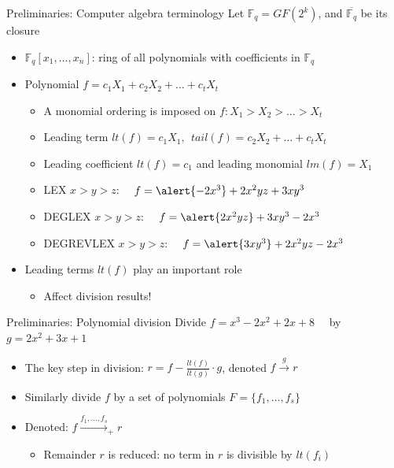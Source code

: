\documentclass[xcolor=dvipsnames]{beamer}
\newcommand{\Fq}{{\mathbb{F}}_{q}}
\newcommand{\bi}{\begin{itemize}}
\newcommand{\ei}{\end{itemize}}
\begin{document}
\begin{frame}{\large{Preliminaries: Computer algebra terminology}}
\vspace{-0.2in}
Let $\mathbb{F}_q = GF(2^k)$, and $\overline{\Fq}$ be its closure
\begin{itemize}
\item $\mathbb{F}_q[x_1, \ldots, x_n]$: ring of all polynomials with
  coefficients in $\mathbb{F}_q$ 

\item Polynomial $f = c_1X_1 + c_2 X_2 + \dots + c_t X_t$
\bi
\item A monomial ordering is imposed on $f: X_1 > X_2 > \dots > X_t$
\item \alert{Leading term} $lt(f) = c_1 X_1, ~~tail(f) = c_2 X_2 + \dots + c_t X_t$
\item Leading coefficient $lt(f) = c_1$ and leading monomial $lm(f) = X_1$
\ei
\begin{itemize}
\item LEX $x> y> z$: ~~$f = \alert{ -2x^3} + 2x^2yz + 3xy^3$
\item  DEGLEX $x>y>z$:  ~~$f = \alert{ 2x^2yz} + 3xy^3 -2x^3$
\item DEGREVLEX $x>y>z$: ~~$f = \alert{3xy^3} + 2x^2yz - 2x^3$
\end{itemize}
\end{itemize}
\bi
\item Leading terms $lt(f)$ play an important role
\bi
\item Affect division results!
\ei
\ei

\end{frame}
\begin{frame}{\large{Preliminaries: Polynomial division}}
Divide $f = x^3-2x^2+2x+8$ ~~by ~~$g =2x^2+3x + 1$\\

\pause


\pause

\bi
\item The key step in division: \alert{$r = f - \frac{lt(f)}{lt(g)}\cdot  g$}, denoted $f\xrightarrow{g} r$
\item Similarly divide $f$ by a set of polynomials $F = \{f_1,\dots, f_s\}$
\item Denoted: $f \xrightarrow{f_1, \dots, f_s}_+ r$
\bi
\item Remainder $r$ is reduced: no term in $r$ is divisible by $lt(f_i)$
\ei
\ei
\end{frame}
\end{document}
